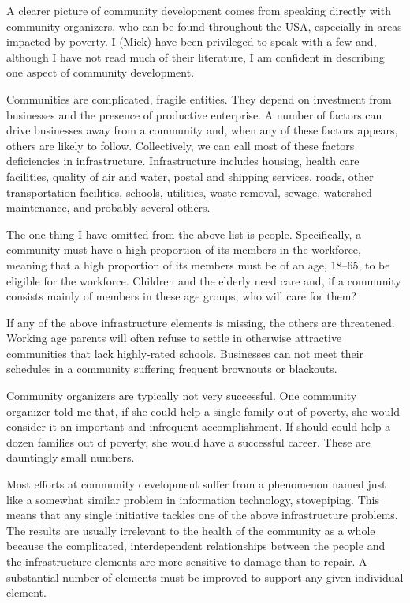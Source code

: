 A clearer picture of community development comes from speaking directly
with community organizers, who can be found throughout the USA,
especially in areas impacted by poverty. I (Mick) have been privileged
to speak with a few and, although I have not read much of their
literature, I am confident in describing one aspect of community
development.

Communities are complicated, fragile entities. They depend on investment
from businesses and the presence of productive enterprise. A number of
factors can drive businesses away from a community and, when any of
these factors appears, others are likely to follow. Collectively, we can
call most of these factors deficiencies in infrastructure.
Infrastructure includes housing, health care facilities, quality of air
and water, postal and shipping services, roads, other transportation
facilities, schools, utilities, waste removal, sewage, watershed
maintenance, and probably several others.

The one thing I have omitted from the above list is people.
Specifically, a community must have a high proportion of its members in
the workforce, meaning that a high proportion of its members must be of
an age, 18--65, to be eligible for the workforce. Children and the
elderly need care and, if a community consists mainly of members in
these age groups, who will care for them?

If any of the above infrastructure elements is missing, the others are
threatened. Working age parents will often refuse to settle in otherwise
attractive communities that lack highly-rated schools. Businesses can
not meet their schedules in a community suffering frequent brownouts or
blackouts.

Community organizers are typically not very successful. One community
organizer told me that, if she could help a single family out of
poverty, she would consider it an important and infrequent
accomplishment. If should could help a dozen families out of poverty,
she would have a successful career. These are dauntingly small numbers.

Most efforts at community development suffer from a phenomenon named
just like a somewhat similar problem in information technology,
stovepiping. This means that any single initiative tackles one of the
above infrastructure problems. The results are usually irrelevant to the
health of the community as a whole because the complicated,
interdependent relationships between the people and the infrastructure
elements are more sensitive to damage than to repair. A substantial
number of elements must be improved to support any given individual
element.

